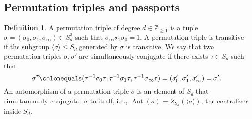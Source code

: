 \documentclass{dcthesis}
\newcommand{\PP}{\mathbb P}
\newcommand{\CC}{\mathbb C}
\newcommand{\QQ}{\mathbb Q}
\newcommand{\ZZ}{\mathbb Z}
\newcommand{\defi}[1]{\textsf{#1}}
\DeclareMathOperator{\Aut}{Aut}
\DeclareMathOperator{\Mon}{Mon}
\DeclareMathOperator{\Gal}{Gal}
\theoremstyle{definition}
\newtheorem{definition}[prop]{Definition}
\theoremstyle{remark}
\numberwithin{equation}{section}
\numberwithin{figure}{section}
\begin{document}
{{    \subsection{Permutation triples and passports}{\label{subsec:passports}
      \begin{definition}
        \label{def:permutationtriple}
        A \defi{permutation triple} of degree $d \in \ZZ_{\geq 1}$ is a tuple $\sigma =
        (\sigma_0,\sigma_1,\sigma_\infty)\in S_d^3$ such that $\sigma_\infty \sigma_1
        \sigma_0 = 1$.
        A permutation triple is \defi{transitive} if the subgroup
        $\langle \sigma \rangle \leq S_d$ generated by $\sigma$ is transitive.
        We say
        that two permutation triples $\sigma,\sigma'$ are \defi{simultaneously
        conjugate} if there exists $\tau\in S_d$ such that
        \begin{equation}\label{eqn:simconj}
          \sigma^\tau \colonequals
          (\tau^{-1}\sigma_0\tau, \tau^{-1}\sigma_1\tau, \tau^{-1}\sigma_\infty\tau)
          = \left(\sigma'_0,\sigma'_1,\sigma'_\infty\right)
          = \sigma'.
        \end{equation}
        An \defi{automorphism} of a permutation triple $\sigma$ is an element of $S_d$ that
        simultaneously conjugates $\sigma$ to itself, i.e.,
        $\Aut(\sigma)=Z_{S_d}(\langle \sigma \rangle)$, the centralizer inside $S_d$.

\end{definition}}}}
\end{document}
